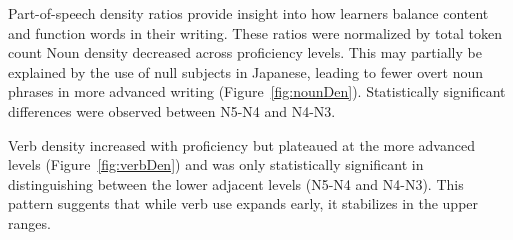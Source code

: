 Part-of-speech density ratios provide insight into how learners balance content and function words in their writing.
These ratios were normalized by total token count
Noun density decreased across proficiency levels. This may partially be explained by the use of null subjects in
Japanese, leading to fewer overt noun phrases in more advanced writing (Figure~\ref{fig:nounDen}). Statistically significant
differences were
observed between N5-N4 and N4-N3.

Verb density increased with proficiency but plateaued at the more advanced levels (Figure~\ref{fig:verbDen}) and was only
statistically
significant in distinguishing between the lower adjacent levels (N5-N4 and N4-N3). This pattern suggents that while
verb use expands early, it stabilizes in the upper ranges.

